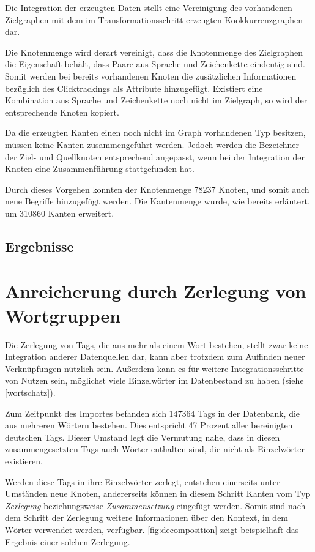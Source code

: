 Die Integration der erzeugten Daten stellt eine Vereinigung des vorhandenen Zielgraphen mit dem im Transformationsschritt erzeugten Kookkurrenzgraphen dar.

Die Knotenmenge wird derart vereinigt, dass die Knotenmenge des Zielgraphen die Eigenschaft behält, dass Paare aus Sprache und Zeichenkette eindeutig sind. Somit werden bei bereits vorhandenen Knoten die zusätzlichen Informationen bezüglich des Clicktrackings als Attribute hinzugefügt. Existiert eine Kombination aus Sprache und Zeichenkette noch nicht im Zielgraph, so wird der entsprechende Knoten kopiert.

Da die erzeugten Kanten einen noch nicht im Graph vorhandenen Typ besitzen, müssen keine Kanten zusammengeführt werden. Jedoch werden die Bezeichner der Ziel- und Quellknoten entsprechend angepasst, wenn bei der Integration der Knoten eine Zusammenführung stattgefunden hat.

Durch dieses Vorgehen konnten der Knotenmenge \num{78237} Knoten, und somit auch neue Begriffe hinzugefügt werden. Die Kantenmenge wurde, wie bereits erläutert, um \num{310860} Kanten erweitert.

\subsection{Ergebnisse}

\section{Anreicherung durch Zerlegung von Wortgruppen}
\label{decomposition}

Die Zerlegung von Tags, die aus mehr als einem Wort bestehen, stellt zwar keine Integration anderer Datenquellen dar, kann aber trotzdem zum Auffinden neuer Verknüpfungen nützlich sein. Außerdem kann es für weitere Integrationsschritte von Nutzen sein, möglichst viele Einzelwörter im Datenbestand zu haben (siehe \cref{wortschatz}).

Zum Zeitpunkt des Importes befanden sich \num{147364} Tags in der Datenbank, die aus mehreren Wörtern bestehen. Dies entspricht \num{47} Prozent aller bereinigten deutschen Tags. Dieser Umstand legt die Vermutung nahe, dass in diesen zusammengesetzten Tags auch Wörter enthalten sind, die nicht als Einzelwörter existieren.

Werden diese Tags in ihre Einzelwörter zerlegt, entstehen einerseits unter Umständen neue Knoten, andererseits können in diesem Schritt Kanten vom Typ \emph{Zerlegung} beziehungsweise \emph{Zusammensetzung} eingefügt werden. Somit sind nach dem Schritt der Zerlegung weitere Informationen über den Kontext, in dem Wörter verwendet werden, verfügbar. \cref{fig:decomposition} zeigt beispielhaft das Ergebnis einer solchen Zerlegung.

